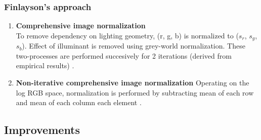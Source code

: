 \documentclass[hyp]{socreport}
\begin{document}
\subsubsection{Finlayson's approach}

\begin{enumerate}

\item \textbf{Comprehensive image normalization} \\
To remove dependency on lighting geometry, (r, g, b) is normalized to ($s_r$,
$s_g$, $s_b$). Effect of illuminant is removed using grey-world normalization.
These two-processes are performed succesively for 2 iterations (derived from
empirical results) .

\item \textbf{Non-iterative comprehensive image normalization}
Operating on the log RGB space, normalization is performed by subtracting mean
of each row and mean of each column each element .

\end{enumerate}

\subsection{Improvements}
\end{document}
